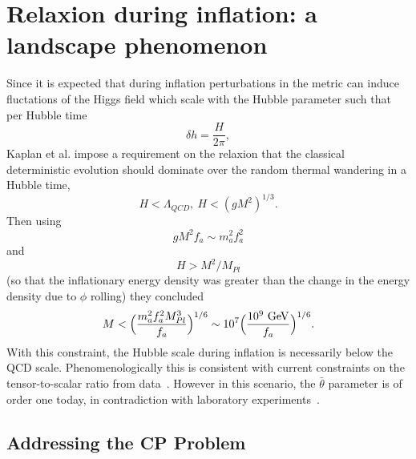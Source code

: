 \documentclass[12pt,aps,prd,showpacs,notitlepage,nofootinbib]{revtex4-1}
\newcommand{\gev}{\ {\rm GeV}}
\newcommand{\beq}{\begin{equation}}
\newcommand{\eeq}{\end{equation}}
\begin{document}
\section{Relaxion during inflation: a landscape phenomenon}

Since it is expected that during inflation perturbations in the metric can induce fluctations of the Higgs field which scale with the Hubble parameter such that per Hubble time~\cite{2005pfc..book.....M}
\beq
\delta h = \frac{H}{2\pi},
\eeq
Kaplan et al. impose a requirement on the relaxion that the classical deterministic evolution should dominate over the random thermal wandering  in a Hubble time, 
\beq \label{lowH}
H<\Lambda_{QCD}, \  H < (g M^2)^{1/3}.
\eeq
Then using  
\beq
g M^2 f_a\sim m_a^2 f_a^2
\eeq and 
\beq \label{Hdom}
H>M^2/M_{Pl}
\eeq (so that the inflationary energy density was greater than the change in the energy density due to $\phi $ rolling) they concluded
\beq
M<\Big(\frac{m_a^2 f_a^2 M_{Pl}^3}{f_a}\Big)^{1/6}\sim 10^7 \Big(\frac{10^9 \gev}{f_a}\Big)^{1/6}.
\eeq
With this constraint, the Hubble scale during inflation is necessarily below the QCD scale. Phenomenologically this is consistent with current constraints on the tensor-to-scalar ratio from data~\cite{2016AA...594A..13P}. However in this scenario, the  $\bar\theta$  parameter is of order one today, in contradiction with laboratory experiments~\cite{PhysRevD.92.092003}. 

\subsection{Addressing the CP Problem}
\end{document}
